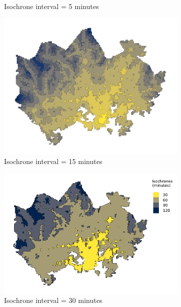 \begin{figure}[H]
\begin{subfigure}[b]{0.5\textwidth}
		\caption{Isochrone interval = 5 minutes}
		\label{fig:interval 10}
	\end{subfigure}%
	\hfill
	\begin{subfigure}[b]{0.5\textwidth}
		\includegraphics[width=\textwidth]{visual/figures/ttm/isochrone_interval_15}
		\caption{Isochrone interval = 15 minutes}
		\label{fig:interval 15}
	\end{subfigure}%
	\hfill
	\begin{subfigure}[b]{0.5\textwidth}
		\includegraphics[width=\textwidth]{visual/figures/ttm/isochrone_interval_30}
		\caption{Isochrone interval = 30 minutes}
		\label{fig:interval 30}
	\end{subfigure}%
	\hfill
	\begin{subfigure}[b]{0.4\textwidth}

\end{subfigure}
\end{figure}
